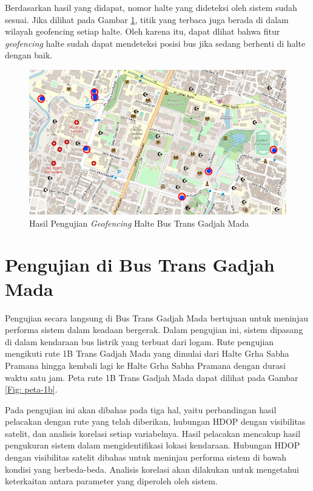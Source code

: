 Berdasarkan hasil yang didapat, nomor halte yang dideteksi oleh sistem sudah sesuai. Jika dilihat pada Gambar \ref{Fig: geofencing-2}, titik yang terbaca juga berada di dalam wilayah geofencing setiap halte. Oleh karena itu, dapat dlihat bahwa fitur \textit{geofencing} halte sudah dapat mendeteksi posisi bus jika sedang berhenti di halte dengan baik.

\begin{figure}[H]
	\centering
	\includegraphics[width=12cm]{contents/chapter-4/geofencing/halte.png}
	\caption{Hasil Pengujian \textit{Geofencing}  Halte Bus Trans Gadjah Mada}
	\label{Fig: geofencing-2}
\end{figure}

\section{Pengujian di Bus Trans Gadjah Mada}
Pengujian secara langsung di Bus Trans Gadjah Mada bertujuan untuk meninjau performa sistem dalam keadaan bergerak. Dalam pengujian ini, sistem dipasang di dalam kendaraan bus listrik yang terbuat dari logam. Rute pengujian mengikuti rute 1B Trans Gadjah Mada yang dimulai dari Halte Grha Sabha Pramana hingga kembali lagi ke Halte Grha Sabha Pramana dengan durasi waktu satu jam. Peta rute 1B Trans Gadjah Mada dapat dilihat pada Gambar \ref{Fig: peta-1b}.

Pada pengujian ini akan dibahas pada tiga hal, yaitu perbandingan hasil pelacakan dengan rute yang telah diberikan, hubungan HDOP dengan visibilitas satelit, dan analisis korelasi setiap variabelnya. Hasil pelacakan mencakup hasil pengukuran sistem dalam mengidentifikasi lokasi kendaraan. Hubungan HDOP dengan visibilitas satelit dibahas untuk meninjau performa sistem di bawah kondisi yang berbeda-beda. Analisis korelasi akan dilakukan untuk mengetahui keterkaitan antara parameter yang diperoleh oleh sistem.


